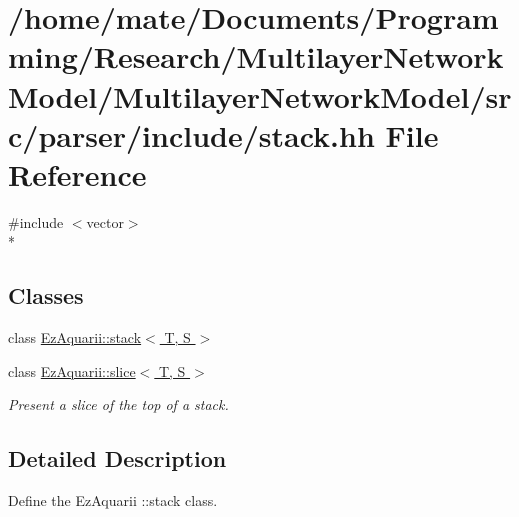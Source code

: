 \hypertarget{stack_8hh}{}\section{/home/mate/\+Documents/\+Programming/\+Research/\+Multilayer\+Network\+Model/\+Multilayer\+Network\+Model/src/parser/include/stack.hh File Reference}
\label{stack_8hh}
{\ttfamily \#include $<$vector$>$}\\*
\subsection*{Classes}
\begin{DoxyCompactItemize}
\item 
class \hyperlink{classEzAquarii_1_1stack}{Ez\+Aquarii\+::stack$<$ T, S $>$}
\item 
class \hyperlink{classEzAquarii_1_1slice}{Ez\+Aquarii\+::slice$<$ T, S $>$}
\begin{DoxyCompactList}\small\item\em Present a slice of the top of a stack. \end{DoxyCompactList}\end{DoxyCompactItemize}


\subsection{Detailed Description}
Define the Ez\+Aquarii \+::stack class. 